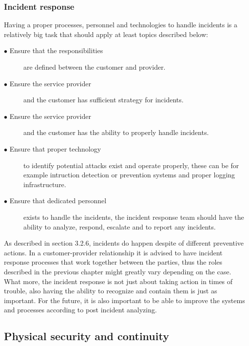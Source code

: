 \documentclass{article}
\begin{document}
\subsubsection{Incident response}
Having a proper processes, personnel and technologies to handle incidents is a relatively big task that should apply at least topics described below:
\begin{description}
	\item[$\bullet$ Ensure that the responsibilities] are defined between the customer and provider.
	\item[$\bullet$ Ensure the service provider] and the customer has sufficient strategy for incidents.
	\item[$\bullet$ Ensure the service provider] and the customer has the ability to properly handle incidents.
	\item[$\bullet$ Ensure that proper technology] to identify potential attacks exist and operate properly, these can be for example intruction detection or prevention systems and proper logging infrastructure.
	\item[$\bullet$ Ensure that dedicated personnel] exists to handle the incidents, the incident response team should have the ability to analyze, respond, escalate and to report any incidents.
\end{description}
\par
As described in section 3.2.6, incidents do happen despite of different preventive actions. In a customer-provider relationship it is advised to have incident response processes that work together between the parties, thus the roles described in the previous chapter might greatly vary depending on the case. What more, the incident response is not just about taking action in times of trouble, also having the ability to recognize and contain them is just as important. For the future, it is also important to be able to improve the systems and processes according to post incident analyzing.

\subsection{Physical security and continuity}
\end{document}
